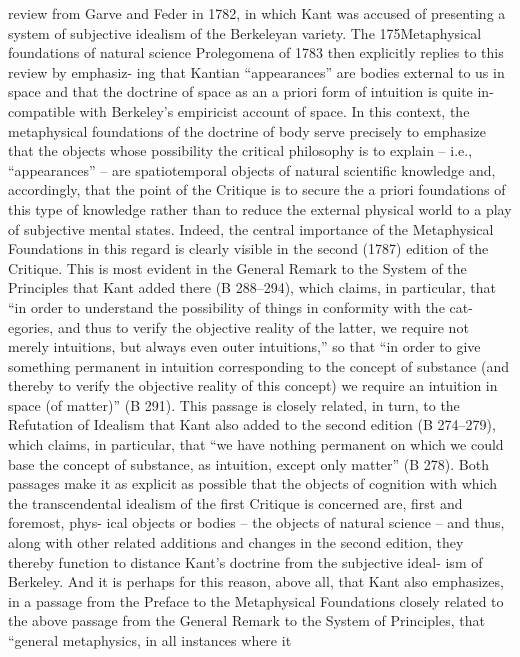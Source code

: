 review from Garve and Feder in 1782, in which Kant was accused of
presenting a system of subjective idealism of the Berkeleyan variety. The
175Metaphysical foundations of natural science
Prolegomena of 1783 then explicitly replies to this review by emphasiz-
ing that Kantian “appearances” are bodies external to us in space and
that the doctrine of space as an a priori form of intuition is quite in-
compatible with Berkeley’s empiricist account of space. In this context,
the metaphysical foundations of the doctrine of body serve precisely to
emphasize that the objects whose possibility the critical philosophy is
to explain – i.e., “appearances” – are spatiotemporal objects of natural
scientiﬁc knowledge and, accordingly, that the point of the Critique is to
secure the a priori foundations of this type of knowledge rather than to
reduce the external physical world to a play of subjective mental states.
Indeed, the central importance of the Metaphysical Foundations in this
regard is clearly visible in the second (1787) edition of the Critique. This
is most evident in the General Remark to the System of the Principles
that Kant added there (B 288–294), which claims, in particular, that “in
order to understand the possibility of things in conformity with the cat-
egories, and thus to verify the objective reality of the latter, we require not
merely intuitions, but always even outer intuitions,” so that “in order to
give something permanent in intuition corresponding to the concept of
substance (and thereby to verify the objective reality of this concept) we
require an intuition in space (of matter)” (B 291). This passage is closely
related, in turn, to the Refutation of Idealism that Kant also added to the
second edition (B 274–279), which claims, in particular, that “we have
nothing permanent on which we could base the concept of substance, as
intuition, except only matter” (B 278). Both passages make it as explicit
as possible that the objects of cognition with which the transcendental
idealism of the ﬁrst Critique is concerned are, ﬁrst and foremost, phys-
ical objects or bodies – the objects of natural science – and thus, along
with other related additions and changes in the second edition, they
thereby function to distance Kant’s doctrine from the subjective ideal-
ism of Berkeley. And it is perhaps for this reason, above all, that Kant also
emphasizes, in a passage from the Preface to the Metaphysical Foundations
closely related to the above passage from the General Remark to the
System of Principles, that “general metaphysics, in all instances where it
